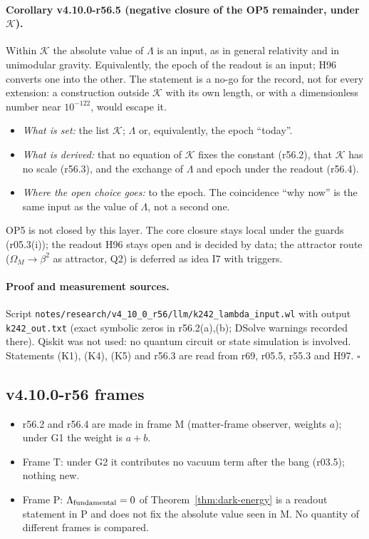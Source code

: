 \paragraph{Corollary v4.10.0-r56.5 (negative closure of the OP5 remainder, under \(\mathcal K\)).}
Within \(\mathcal K\) the absolute value of \(\Lambda\) is an input, as in general relativity and in unimodular gravity.  Equivalently, the epoch of
the readout is an input; H96 converts one into the other.  The statement is a no-go for the record, not for every extension: a construction
outside \(\mathcal K\) with its own length, or with a dimensionless number near \(10^{-122}\), would escape it.
\begin{itemize}[leftmargin=2em]
\item \emph{What is set:} the list \(\mathcal K\); \(\Lambda\) or, equivalently, the epoch ``today''.
\item \emph{What is derived:} that no equation of \(\mathcal K\) fixes the constant (r56.2), that \(\mathcal K\) has no scale (r56.3), and the exchange of
\(\Lambda\) and epoch under the readout (r56.4).
\item \emph{Where the open choice goes:} to the epoch.  The coincidence ``why now'' is the same input as the value of \(\Lambda\), not a second one.
\end{itemize}
OP5 is not closed by this layer.  The core closure stays local under the guards (r05.3(i)); the readout H96 stays open and is decided by data;
the attractor route (\(\Omega_M\to\beta^2\) as attractor, Q2) is deferred as idea I7 with triggers.

\paragraph{Proof and measurement sources.}
Script \texttt{notes/\allowbreak research/\allowbreak v4\_10\_0\_r56/\allowbreak llm/\allowbreak k242\_\allowbreak lambda\_\allowbreak input.wl} with output
\texttt{k242\_\allowbreak out.txt} (exact symbolic zeros in r56.2(a),(b); DSolve warnings recorded there).  Qiskit was not used: no quantum circuit or
state simulation is involved.  Statements (K1), (K4), (K5) and r56.3 are read from r69, r05.5, r55.3 and H97.  \(\square\)

\subsection*{v4.10.0-r56 frames}
\label{subsec:v4100-r56-frames}

\begin{itemize}[leftmargin=2em]
\item r56.2 and r56.4 are made in frame M (matter-frame observer, weights \(a\)); under G1 the weight is \(a+b\).
\item Frame T: under G2 it contributes no vacuum term after the bang (r03.5); nothing new.
\item Frame P: \(\Lambda_{\rm fundamental}=0\) of Theorem~\ref{thm:dark-energy} is a readout statement in P and does not fix the absolute value seen in M.
No quantity of different frames is compared.
\end{itemize}


